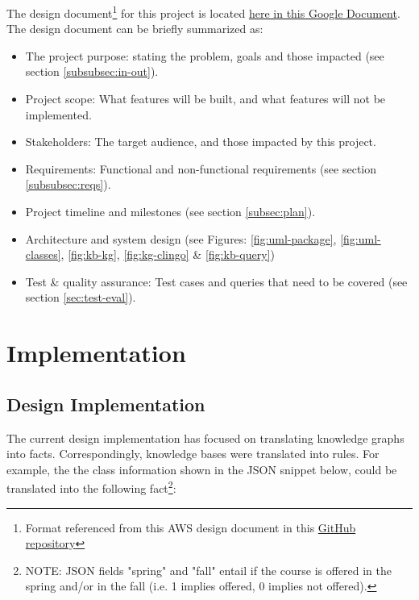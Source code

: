 \documentclass[12pt]{article}
\def \desDocLink{https://docs.google.com/document/d/1t48in8rdzC_VOijfAOP23C_YgAQxkow5eaE7AXEVUYM/edit?usp=sharing}
\begin{document}
    The design document\footnote{Format referenced from this AWS design document in this \href{https://github.com/aws/aws-sam-cli/blob/develop/designs/intrinsics_design.md}{GitHub repository}} for this project is located \href{\desDocLink}{here in this Google Document}. The design document can be briefly summarized as:

    \begin{itemize}
        \item The project purpose: stating the problem, goals and those impacted (see section \ref{subsubsec:in-out}).
        \item Project scope: What features will be built, and what features will not be implemented.
        \item Stakeholders: The target audience, and those impacted by this project.
        \item Requirements: Functional and non-functional requirements (see section \ref{subsubsec:reqs}).
        \item Project timeline and milestones (see section \ref{subsec:plan}).
        \item Architecture and system design (see Figures: \ref{fig:uml-package}, \ref{fig:uml-classes}, \ref{fig:kb-kg}, \ref{fig:kg-clingo} \& \ref{fig:kb-query})
        \item Test \& quality assurance: Test cases and queries that need to be covered (see section \ref{sec:test-eval}).
    \end{itemize}
    
    \section{Implementation}
    \label{sec:implement}

    \subsection{Design Implementation}
    \label{subsec:des-imp}

    The current design implementation has focused on translating knowledge graphs into facts. Correspondingly, knowledge bases were translated into rules. For example, the the class information shown in the JSON snippet below,  could be translated into the following fact\footnote{NOTE: JSON fields "spring" and "fall" entail if the course is offered in the spring and/or in the fall (i.e. 1 implies offered, 0 implies not offered).}:
\end{document}
